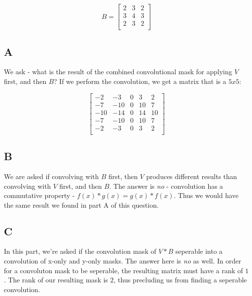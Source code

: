 \documentclass{article}
\begin{document}
\begin{equation}
    B = \begin{bmatrix}
        2 & 3 & 2 \\
        3 & 4 & 3 \\
        2 & 3 & 2 \\
    \end{bmatrix}
\end{equation}

\subsection*{A}

We ask - what is the result of the combined convolutional mask for applying $V$ first, and then $B$? If we perform the convolution, we get a matrix that is a $5x5$:

\begin{equation}
    \begin{bmatrix}
        -2 & -3 & 0 & 3 & 2 \\
        -7 & -10 & 0 & 10 & 7 \\
        -10 & -14 & 0 & 14 & 10 \\
        -7 & -10 & 0 & 10 & 7 \\
        -2 & -3 & 0 & 3 & 2 \\
    \end{bmatrix}
\end{equation}

\subsection*{B}

We are asked if convolving with $B$ first, then $V$ produces different results than convolving with $V$ first, and then $B$. The answer is \emph{no} - convolution has a commutative property - $f(x)*g(x) = g(x)*f(x)$. Thus we would have the same result we found in part A of this question.

\subsection*{C}

In this part, we're asked if the convolution mask of $V*B$ seperable into a convolution of x-only and y-only masks. The answer here is \emph{no} as well. In order for a convoluton mask to be seperable, the resulting matrix must have a rank of $1$. The rank of our resulting mask is $2$, thus precluding us from finding a seperable convolution.
\end{document}
